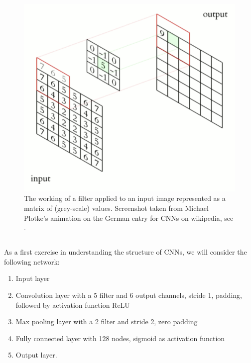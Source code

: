 \documentclass[12pt]{article}
\begin{document}
\begin{figure}[ht]
\centering
   \includegraphics[scale=0.6]{graphics/CNNs.png}
    \caption{The working of a filter applied to an input image represented as a matrix of (grey-scale) values. Screenshot taken from Michael Plotke's animation on the German entry for CNNs on wikipedia, see \cite{Plotke}.}
    \label{fig:exercise1a}
\end{figure}

\subsection{}\label{sec:exercise1b}
As a first exercise in understanding the structure of CNNs, we will consider the following network: \\
\begin{enumerate}[nolistsep]
\item Input layer
\item Convolution layer with a 5 filter and 6 output channels, stride 1, padding, followed by activation function ReLU
\item Max pooling layer with a 2 filter and stride 2, zero padding
\item Fully connected layer with 128 nodes, sigmoid as activation function
\item Output layer.\\
\end{enumerate}
\end{document}
